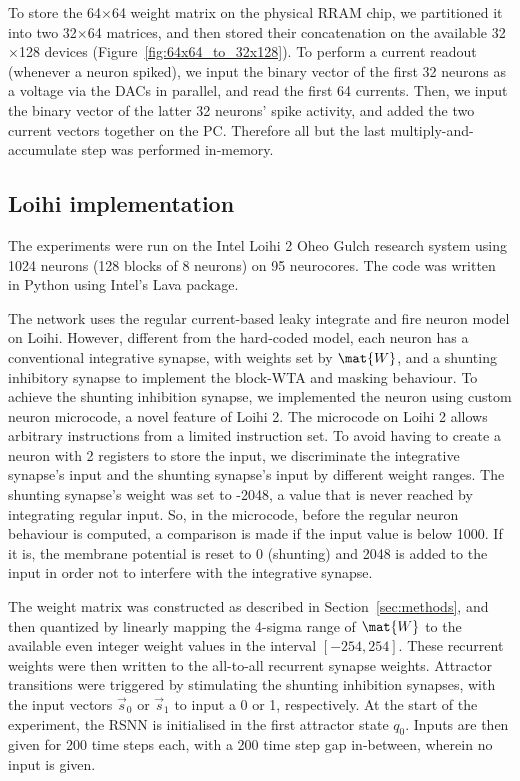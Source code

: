To store the 64$\times$64 weight matrix on the physical RRAM chip, we partitioned it into two 32$\times$64 matrices, and then stored their concatenation on the available 32$\times$128 devices \mbox{(Figure \ref{fig:64x64_to_32x128})}. To perform a current readout (whenever a neuron spiked), we input the binary vector of the first 32 neurons as a voltage via the DACs in parallel, and read the first 64 currents. Then, we input the binary vector of the latter 32 neurons' spike activity, and added the two current vectors together on the PC. Therefore all but the last multiply-and-accumulate step was performed in-memory.




\subsection{Loihi implementation}
The experiments were run on the Intel Loihi 2 Oheo Gulch research system using 1024 neurons (128 blocks of 8 neurons) on 95 neurocores. The code was written in Python using Intel's Lava package.

The network uses the regular current-based leaky integrate and fire neuron model on Loihi. 
However, different from the hard-coded model, each neuron has a conventional integrative synapse, with weights set by $\mat{W}$, and a shunting inhibitory synapse to implement the block-WTA and masking behaviour. To achieve the shunting inhibition synapse, we implemented the neuron using custom neuron microcode, a novel feature of Loihi 2.
The microcode on Loihi 2 allows arbitrary instructions from a limited instruction set. To avoid having to create a neuron with 2 registers to store the input, we discriminate the integrative synapse's input and the shunting synapse's input by different weight ranges. The shunting synapse's weight was set to -2048, a value that is never reached by integrating regular input. So, in the microcode, before the regular neuron behaviour is computed, a comparison is made if the input value is below 1000. If it is, the membrane potential is reset to 0 (shunting) and 2048 is added to the input in order not to interfere with the integrative synapse.


The weight matrix was constructed as described in \mbox{Section \ref{sec:methods}}, and then quantized by linearly mapping the 4-sigma range of $\mat{W}$ to the available even integer weight values in the interval $[-254, 254]$. These recurrent weights were then written to the all-to-all recurrent synapse weights. Attractor transitions were triggered by stimulating the shunting inhibition synapses, with the input vectors $\vec{s}_0$ or $\vec{s}_1$ to input a 0 or 1, respectively. At the start of the experiment, the RSNN is initialised in the first attractor state $q_0$. Inputs are then given for 200 time steps each, with a 200 time step gap in-between, wherein no input is given.




